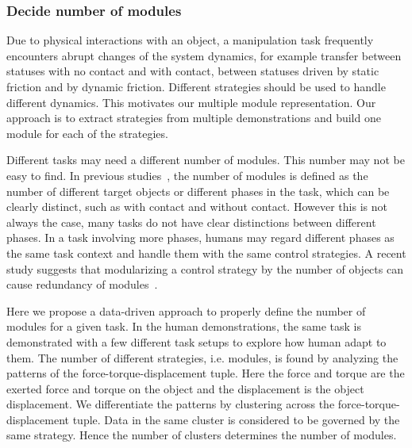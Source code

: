 \subsubsection{Decide number of modules}
\label{cha4:sec2:learn:cluster}

Due to physical interactions with an object, a manipulation task
frequently encounters abrupt changes of the system dynamics, for
example transfer between statuses with no contact and with contact,
between statuses driven by static friction and by
dynamic friction. Different strategies should be used to handle
different dynamics. This motivates our multiple module
representation. Our approach is to extract strategies from multiple
demonstrations and build one module for each of the
strategies.

Different tasks may need a different number of modules. This number may not be easy to find. In previous studies~\cite{sugimoto2012emosaic,haruno2001mosaic}, the number of modules is defined as the number of different target objects or different phases in the task, which can be clearly distinct, such as with contact and without contact. However this is not always the case, many tasks do not have clear distinctions between different phases.
In a task involving more phases, humans may regard different phases as the same task context and handle them with the same control strategies. A recent study suggests that modularizing a control strategy by the number of objects can cause redundancy of modules~\cite{lallee2009}.

Here we propose a data-driven approach to properly define the number of modules for a given task. In the human
demonstrations, the same task is demonstrated with a few different task setups to explore how human adapt to them. The number of different strategies, i.e. modules, is found by analyzing the patterns of the force-torque-displacement tuple. Here the force and torque are the exerted force and torque on the object and the displacement is the object displacement.
We differentiate the patterns by clustering across
the force-torque-displacement tuple. Data in the same cluster is
considered to be governed by the same strategy. Hence the number of clusters
determines the number of modules.


